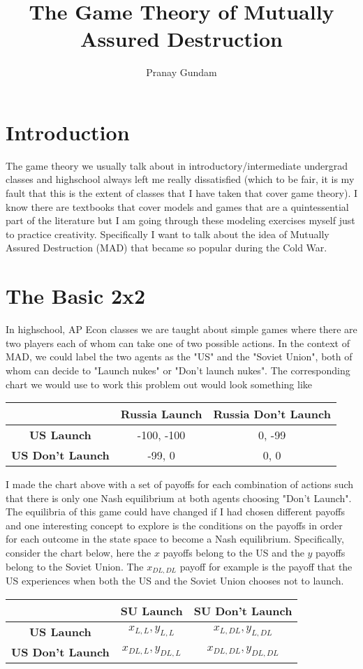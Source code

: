 \documentclass[11pt,english]{article}
\title{\textbf{The Game Theory of Mutually Assured Destruction}}
\author{Pranay Gundam}
\begin{document}
\maketitle
\section*{Introduction}
The game theory we usually talk about in introductory/intermediate undergrad classes and highschool always left me really dissatisfied (which to be fair, it is my fault that this is the extent of classes that I have taken that cover game theory). I know there are textbooks that cover models and games that are a quintessential part of the literature but I am going through these modeling exercises myself just to practice creativity. Specifically I want to talk about the idea of Mutually Assured Destruction (MAD) that became so popular during the Cold War.
\section*{The Basic 2x2}
In highschool, AP Econ classes we are taught about simple games where there are two players each of whom can take one of two possible actions. In the context of MAD, we could label the two agents as the "US" and the "Soviet Union", both of whom can decide to "Launch nukes" or "Don't launch nukes". The corresponding chart we would use to work this problem out would look something like
\begin{center}
\begin{tabular}{ c |c |c| }
& \textbf{Russia Launch} & \textbf{Russia Don't Launch}\\
\hline
\textbf{US Launch} & -100, -100 & 0, -99 \\
\hline
\textbf{US Don't Launch} & -99, 0 & 0, 0 \\
\hline
\end{tabular}
\end{center}

\noindent I made the chart above with a set of payoffs for each combination of actions such that there is only one Nash equilibrium at both agents choosing "Don't Launch". The equilibria of this game could have changed if I had chosen different payoffs and one interesting concept to explore is the conditions on the payoffs in order for each outcome in the state space to become a Nash equilibrium. Specifically, consider the chart below, here the $x$ payoffs belong to the US and the $y$ payoffs belong to the Soviet Union. The $x_{DL,DL}$ payoff for example is the payoff that the US experiences when both the US and the Soviet Union chooses not to launch.
\begin{center}
\begin{tabular}{ c |c |c| }
& \textbf{SU Launch} & \textbf{SU Don't Launch}\\
\hline
\textbf{US Launch} & $x_{L,L}, y_{L,L}$ & $x_{L,DL}, y_{L,DL}$ \\
\hline
\textbf{US Don't Launch} & $x_{DL,L}, y_{DL,L}$ & $x_{DL,DL}, y_{DL,DL}$ \\
\hline
\end{tabular}
\end{center}
\end{document}
